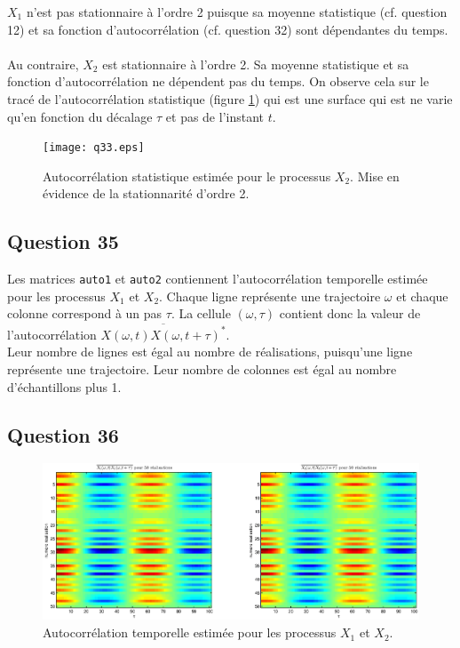 \documentclass{article}
\begin{document}
\noindent
$X_1$ n'est pas stationnaire à l'ordre 2 puisque sa moyenne statistique (cf. question 12) et sa fonction d'autocorrélation (cf. question 32) sont dépendantes du temps.
~ \\
\noindent
Au contraire, $X_2$ est stationnaire à l'ordre 2. Sa moyenne statistique et sa fonction d'autocorrélation ne dépendent pas du temps. On observe cela sur le tracé de l'autocorrélation statistique (figure \ref{fig:autocorrstatx2}) qui est une surface qui est ne varie qu'en fonction du décalage $\tau$ et pas de l'instant $t$.

\begin{figure}[h]
\texttt{[image: q33.eps]}
\caption{Autocorrélation statistique estimée pour le processus $X_2$. Mise en évidence de la stationnarité d'ordre 2.}
\label{fig:autocorrstatx2}
\end{figure}

\subsection*{Question 35}
Les matrices \texttt{auto1} et \texttt{auto2} contiennent l'autocorrélation temporelle estimée pour les processus $X_1$ et $X_2$. Chaque ligne représente une trajectoire $\omega$ et chaque colonne correspond à un pas $\tau$. La cellule $(\omega,\tau)$ contient donc la valeur de l'autocorrélation $\overline{X(\omega,t)X(\omega,t+\tau)^*}$. \\
Leur nombre de lignes est égal au nombre de réalisations, puisqu'une ligne représente une trajectoire. Leur nombre de colonnes est égal au nombre d'échantillons plus 1.

\subsection*{Question 36}
\begin{figure}[!h]
\hspace*{-1.25cm}
\includegraphics[width=15cm]{q35.eps}
\caption{Autocorrélation temporelle estimée pour les processus $X_1$ et $X_2$.}
\label{fig:autocorrtempx1x2}
\end{figure}
\end{document}
